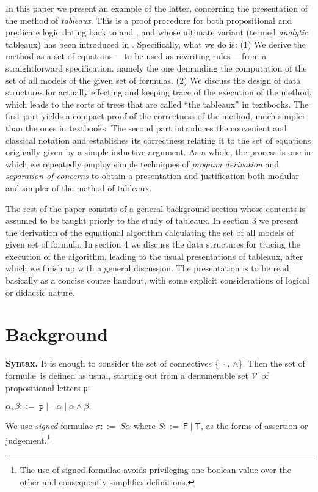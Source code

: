 \documentclass[a4paper,UKenglish]{lipics}
\newcounter{c}
\newcommand{\nentry}[1]{\noindent\textbf{#1}}
\newcommand{\grdef}{\ensuremath{::=\ }}
\newcommand{\lett}[1]{\texttt{#1}}
\newcommand{\sg}[1]{\textsf{#1}}
\newcommand{\vars}{\ensuremath{\mathcal{V}}}
\begin{document}
In this paper we present an example of the latter, concerning the presentation of the method of \textit{tableaux}.
This is a proof procedure for both propositional and predicate logic dating back to \cite{Hintikka} and \cite{Beth}, and whose ultimate variant (termed \textit{analytic} tableaux) has been introduced in \cite{Smullyan}. 
Specifically, what we do is: (1) We derive the method as a set of equations ---to be used as rewriting rules--- from a straightforward specification, namely the one demanding the computation of the set of all models of the given set of formulas.
(2) We discuss the design of data structures for actually effecting and keeping trace of the execution of the method, which leads to the sorts of trees that are called ``the tableaux'' in textbooks.
The first part yields a compact proof of the correctness of the method, much simpler than the ones in textbooks.
The second part introduces the convenient and classical notation and establishes its correctness relating it to the set of equations originally given by a simple inductive argument. 
As a whole, the process is one in which we repeatedly employ simple techniques of \emph{program derivation} and \emph{separation of concerns} to obtain a presentation and justification both modular and simpler of the method of tableaux. 


The rest of the paper consists of a general background section whose contents is assumed to be taught priorly to the study of tableaux. In section 3 we present the derivation of the equational algorithm calculating the set of all models of given set of formula. In section 4 we discuss the data structures for tracing the execution of the algorithm, leading to the usual presentations of tableaux, after which we finish up with a general discussion. The presentation is to be read basically as a concise course handout, with some explicit considerations of logical or didactic nature. 
\section{Background} 

\nentry{Syntax.} It is enough to consider the set of connectives \{$\neg$ , $\wedge$\}. Then the set of formul\ae\ is defined as usual, starting out from a denumerable set \vars\ of propositional letters \lett{p}:


$\alpha , \beta \grdef \lett{p} \mid \neg\alpha \mid \alpha \wedge \beta.$

\noindent We use \textit{signed} formulae
$\sigma \grdef  S \alpha$ where $S \grdef \sg{F} \mid \sg{T}$, as the forms of assertion or judgement.\footnote{The use of signed formulae avoids privileging one boolean value over the other and consequently simplifies definitions.}
\end{document}

